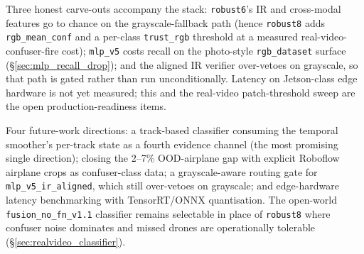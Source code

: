 Three honest carve-outs accompany the stack: \texttt{robust6}'s IR and cross-modal features go to chance on the grayscale-fallback path (hence \texttt{robust8} adds \texttt{rgb\_mean\_conf} and a per-class \texttt{trust\_rgb} threshold at a measured real-video-confuser-fire cost); \texttt{mlp\_v5} costs recall on the photo-style \texttt{rgb\_dataset} surface (\S\ref{sec:mlp_recall_drop}); and the aligned IR verifier over-vetoes on grayscale, so that path is gated rather than run unconditionally. Latency on Jetson-class edge hardware is not yet measured; this and the real-video patch-threshold sweep are the open production-readiness items.

Four future-work directions: a track-based classifier consuming the temporal smoother's per-track state as a fourth evidence channel (the most promising single direction); closing the 2--7\% OOD-airplane gap with explicit Roboflow airplane crops as confuser-class data; a grayscale-aware routing gate for \texttt{mlp\_v5\_ir\_aligned}, which still over-vetoes on grayscale; and edge-hardware latency benchmarking with TensorRT/ONNX quantisation. The open-world \texttt{fusion\_no\_fn\_v1.1} classifier remains selectable in place of \texttt{robust8} where confuser noise dominates and missed drones are operationally tolerable (\S\ref{sec:realvideo_classifier}).

